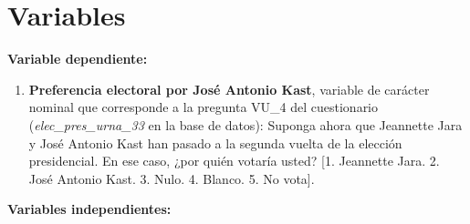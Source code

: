 \documentclass[
  spanish,
  a4paper,
  oneside]{scrbook}
\providecommand{\tightlist}{%
  \setlength{\itemsep}{0pt}\setlength{\parskip}{0pt}}
\begin{document}
\section{Variables}\label{variables}

\textbf{Variable dependiente:}

\begin{enumerate}
\def\labelenumi{\arabic{enumi}.}
\tightlist
\item
  \textbf{Preferencia electoral por José Antonio Kast}, variable de
  carácter nominal que corresponde a la pregunta VU\_4 del cuestionario
  (\emph{elec\_pres\_urna\_33} en la base de datos): Suponga ahora que
  Jeannette Jara y José Antonio Kast han pasado a la segunda vuelta de
  la elección presidencial. En ese caso, ¿por quién votaría usted? {[}1.
  Jeannette Jara. 2. José Antonio Kast. 3. Nulo. 4. Blanco. 5. No
  vota{]}.
\end{enumerate}

\textbf{Variables independientes:}
\end{document}
